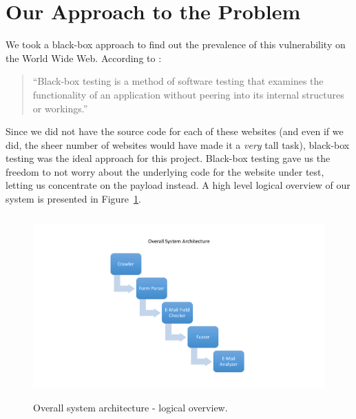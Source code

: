 \section[Approach]{Our Approach to the Problem}
\label{sys:appr}
We took a black-box approach to find out the prevalence of this vulnerability on the World Wide Web. According to \cite{wiki:Black-box_testing}:
\begin{quote}
	``{Black-box testing is a method of software testing that examines the functionality of an application without peering into its internal structures or workings.}''
\end{quote} 

Since we did not have the source code for each of these websites (and even if we did, the sheer number of websites would have made it a \emph{very} tall task), black-box testing was the ideal approach for this project.
Black-box testing gave us the freedom to not worry about the underlying code for the website under test, letting us concentrate on the payload instead. A high level logical overview of our system is presented in Figure~\ref{fig:overall}.

\begin{figure}
	\centering
	\includegraphics[width=14cm, height=7cm]{System/overall_design}
	\caption{Overall system architecture - logical overview.}
	\label{fig:overall}
\end{figure}
